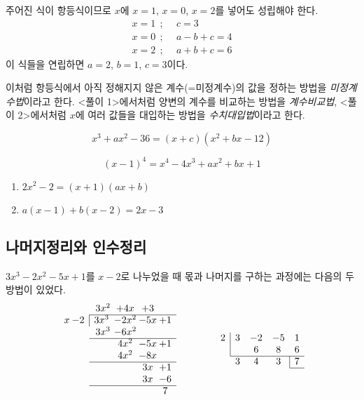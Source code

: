 \documentclass{oblivoir}
\begin{document}
\begin{mdframed}[frametitle=<풀이2>]
주어진 식이 항등식이므로 \(x\)에 \(x=1\), \(x=0\), \(x=2\)를 넣어도 성립해야 한다.
\begin{align*}
x=1	\:\:;	&\:\:c=3\\
x=0	\:\:;	&\:\:a-b+c=4\\
x=2\:\:;	&\:\:a+b+c=6
\end{align*}
이 식들을 연립하면 \(a=2\), \(b=1\), \(c=3\)이다.
\end{mdframed}

이처럼 항등식에서 아직 정해지지 않은 계수(=미정계수)의 값을 정하는 방법을 \emph{미정계수법}이라고 한다.
<풀이 1>에서처럼 양변의 계수를 비교하는 방법을 \emph{계수비교법},
<풀이 2>에서처럼 \(x\)에 여러 값들을 대입하는 방법을 \emph{수치대입법}이라고 한다.

%
\label{iden4}
\[x^3+ax^2-36=(x+c)(x^2+bx-12)\]

%
\label{iden5}
\[(x-1)^4=x^4-4x^3+ax^2+bx+1\]

%
\begin{enumerate}\label{iden6}
\item
\(2x^2-2=(x+1)(ax+b)\)
\item
\(a(x-1)+b(x-2)=2x-3\)
\end{enumerate}

\subsection{나머지정리와 인수정리}
\(3x^3-2x^2-5x+1\)를 \(x-2\)로 나누었을 때 몫과 나머지를 구하는 과정에는 다음의 두 방법이 있었다.
\begin{equation*}
\begin{array}{c@{\:}cc@{\:}c@{\:}c@{\:}c}
&&3x^2&+4x&+3\\
\cline{3-6}
x&-2	&\multicolumn{1}{|c}{3x^3}	&-2x^2&-5x&+1\\
&							&3x^3		&-6x^2\\
\cline{3-6}
&							&			&4x^2	&-5x	&+1\\
&							&			&4x^2	&-8x	&\\
\cline{3-6}
&							&			&		&3x		&+1\\
&							&			&		&3x 	&-6\\
\cline{3-6}
&							&			&		&	 	&7
\end{array}
\qquad\qquad
\begin{array}{ccccc}
\multicolumn{1}{c|}{2}	&3	&-2	&-5	&1\\
\multicolumn{1}{c|}{}		&	&6	&8	&6\\
\cline{2-5}
							&3	&4	&3	&\multicolumn1{|c}{7}\\
\cline{5-5}
\end{array}
\end{equation*}
\end{document}
